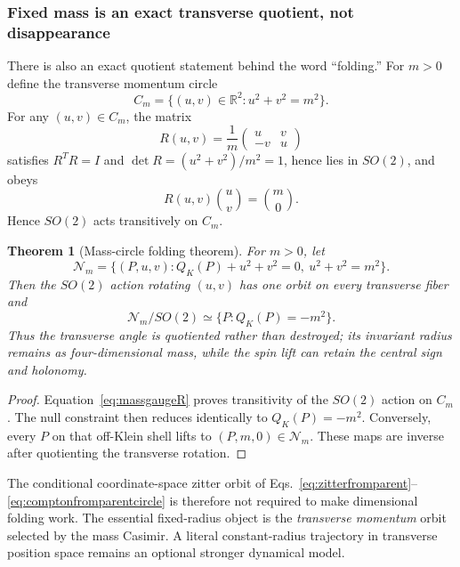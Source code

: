 \documentclass[11pt]{article}
\newtheorem{theorem}{Theorem}[section]
\theoremstyle{definition}\newtheorem{definition}[theorem]{Definition}
\theoremstyle{remark}\newtheorem{remark}[theorem]{Remark}\newtheorem{conjecture}[theorem]{Conjecture}
\begin{document}
\subsubsection{Fixed mass is an exact transverse quotient, not disappearance}
There is also an exact quotient statement behind the word ``folding.'' For $m>0$ define the transverse momentum circle
\begin{equation}
 C_m=\{(u,v)\in\mathbb R^2:u^2+v^2=m^2\}.
\end{equation}
For any $(u,v)\in C_m$, the matrix
\begin{equation}\label{eq:massgaugeR}
 R(u,v)=\frac1m
 \begin{pmatrix}
 u&v\\-v&u
 \end{pmatrix}
\end{equation}
satisfies $R^TR=I$ and $\det R=(u^2+v^2)/m^2=1$, hence lies in $SO(2)$, and obeys
\begin{equation}
 \boxed{R(u,v)\binom uv=\binom m0.}
\end{equation}
Hence $SO(2)$ acts transitively on $C_m$.

\begin{theorem}[Mass-circle folding theorem]\label{thm:masscirclefold}
For $m>0$, let
\begin{equation}
 \mathcal N_m=
 \{(P,u,v):Q_K(P)+u^2+v^2=0,\ u^2+v^2=m^2\}.
\end{equation}
Then the $SO(2)$ action rotating $(u,v)$ has one orbit on every transverse fiber and
\begin{equation}\label{eq:massquotient}
 \boxed{
 \mathcal N_m/SO(2)
 \simeq
 \{P:Q_K(P)=-m^2\}.}
\end{equation}
Thus the transverse angle is quotiented rather than destroyed; its invariant radius remains as four-dimensional mass, while the spin lift can retain the central sign and holonomy.
\end{theorem}
\begin{proof}
Equation~\eqref{eq:massgaugeR} proves transitivity of the $SO(2)$ action on $C_m$. The null constraint then reduces identically to $Q_K(P)=-m^2$. Conversely, every $P$ on that off-Klein shell lifts to $(P,m,0)\in\mathcal N_m$. These maps are inverse after quotienting the transverse rotation.
\end{proof}

The conditional coordinate-space zitter orbit of Eqs.~\eqref{eq:zitterfromparent}--\eqref{eq:comptonfromparentcircle} is therefore not required to make dimensional folding work. The essential fixed-radius object is the \emph{transverse momentum} orbit selected by the mass Casimir. A literal constant-radius trajectory in transverse position space remains an optional stronger dynamical model.
\end{document}
